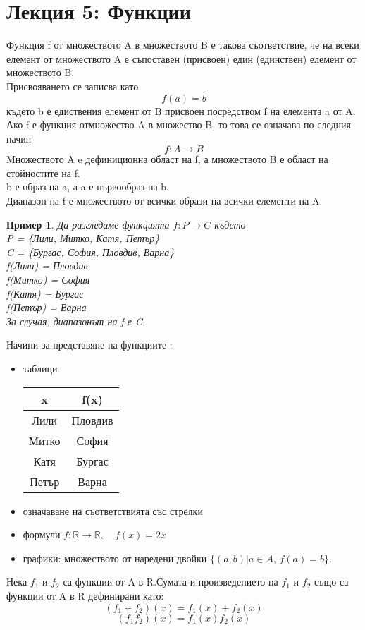 \documentclass[fleqn, 12pt]{article}
\newtheorem{example}{Пример}[subsection]
\begin{document}
\section{Лекция 5: Функции}
Функция f от множеството A в множеството B е такова съответствие, че на всеки  елемент от множеството A е съпоставен (присвоен) един (единствен) елемент от множеството B.\\
Присвояването се записва като 
$$f(a) = b$$ 
където b е едиствения елемент от B присвоен посредством f на елемента a от A. Ако f е функция отмножество A в множество B, то това се означава по следния начин 
$$f: A \rightarrow B$$
Mножеството A  e дефиниционна област на f, а множеството B е област на стойностите на f. \\
b е образ на a, а a е първообраз на b. \\
Диапазон на f е множеството от всички образи на всички  елементи на A.\\
\begin{example}
Да разгледаме функцията $f: P \rightarrow C$ където \\
P = \{Лили, Митко, Катя, Петър\} \\
C = \{Бургас, София, Пловдив, Варна\}\\
f(Лили) = Пловдив \\
f(Митко) = София \\
f(Катя) = Бургас \\
f(Петър) = Варна \\
За случая, диапазонът на f е C. 
\end{example}
Начини за представяне на функциите :

\begin{itemize}
\item таблици \\
\begin{table}[htp]
  \begin{center}
    \begin{tabular}{|c|c|} 
\hline
      \textbf{x} & \textbf{f(x)}\\
\hline
	Лили & Пловдив  \\ 
\hline
	Митко & София  \\
\hline
	Катя & Бургас \\
\hline
 	Петър & Варна  \\
\hline
    \end{tabular}
  \end{center}
\end{table}

\item означаване на съответствията със стрелки 
\item формули $f:\mathbb{R} \rightarrow \mathbb{R}, \quad f(x) = 2x$
\item графики: множеството от наредени двойки $ \{(a, b) | a \in A, \, f(a) = b\}$.
\end{itemize}
Нека $f_1$ и $f_2$ са функции от A в R.Сумата и произведението на $f_1$ и $f_2$ също са функции от A в R дефинирани като:
$$(f_1+ f_2)(x) =  f_1(x) + f_2(x)$$
$$(f_1f_2)(x) =  f_1(x) f_2(x)$$
\end{document}
